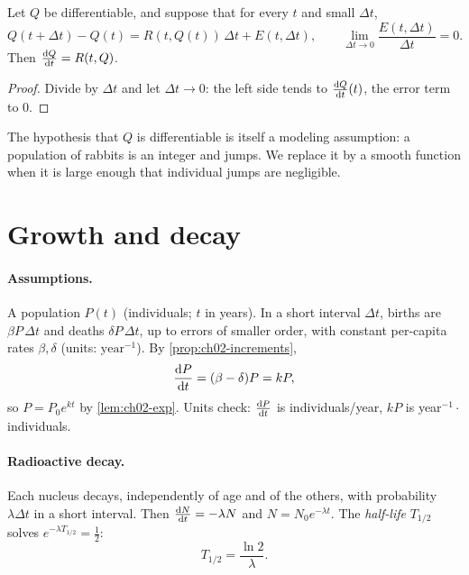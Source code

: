 \begin{proposition}\label{prop:ch02-increments}
Let $Q$ be differentiable, and suppose that for every $t$ and small $\Delta t$,
\[
  Q(t + \Delta t) - Q(t) = R(t, Q(t))\,\Delta t + E(t,\Delta t),
  \qquad \lim_{\Delta t\to0}\frac{E(t,\Delta t)}{\Delta t} = 0 .
\]
Then $\frac{\mathrm{d}Q}{\mathrm{d}t} = R(t, Q)$.
\end{proposition}
\begin{proof}
Divide by $\Delta t$ and let $\Delta t\to 0$: the left side tends to
$\frac{\mathrm{d}Q}{\mathrm{d}t}(t)$, the error term to $0$.
\end{proof}

The hypothesis that $Q$ is differentiable is itself a modeling assumption: a
population of rabbits is an integer and jumps. We replace it by a smooth
function when it is large enough that individual jumps are negligible.

\section{Growth and decay}\label{sec:ch02-growth}

\paragraph{Assumptions.} A population $P(t)$ (individuals; $t$ in years). In a
short interval $\Delta t$, births are $\beta P\,\Delta t$ and deaths
$\delta P\,\Delta t$, up to errors of smaller order, with constant per-capita
rates $\beta,\delta$ (units: $\text{year}^{-1}$). By
\cref{prop:ch02-increments},
\begin{equation}\label{eq:ch02-malthus}
  \frac{\mathrm{d}P}{\mathrm{d}t} = (\beta - \delta)P = kP,
\end{equation}
so $P = P_0e^{kt}$ by \cref{lem:ch02-exp}. Units check: $\frac{\mathrm{d}P}{\mathrm{d}t}$ is
individuals/year, $kP$ is year$^{-1}\cdot$individuals. \checkmark

\paragraph{Radioactive decay.} Each nucleus decays, independently of age and of
the others, with probability $\lambda\Delta t$ in a short interval. Then
$\frac{\mathrm{d}N}{\mathrm{d}t} = -\lambda N$ and $N = N_0e^{-\lambda t}$. The \emph{half-life}
$T_{1/2}$ solves $e^{-\lambda T_{1/2}} = \frac12$:
\[
  T_{1/2} = \frac{\ln 2}{\lambda}.
\]


